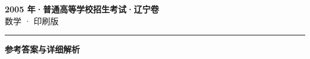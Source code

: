 \documentclass[zihao=5, a4paper]{ctexart}
\begin{document}
\begin{center}
  {\Large\bfseries 2005 年·普通高等学校招生考试·辽宁卷}\\[4pt]
  {\large 数学 · 印刷版}
\end{center}
\medskip
{}

\par\bigskip\hrule\bigskip
{}
\begin{center}{\large\bfseries 参考答案与详细解析}\end{center}
\smallskip

\end{document}
